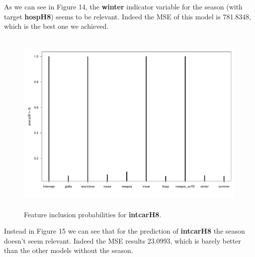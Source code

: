 \documentclass[12pt,a4paper]{article}
\theoremstyle{definition}
\theoremstyle{remark}
\begin{document}
\begin{appendices}
As we can see in Figure 14, the \textbf{winter} indicator variable for the season (with target \textbf{hospH8}) seems to be relevant. Indeed the MSE of this model is 781.8348, which is the best one we achieved.

\begin{figure}[htb!]
	\centering
	\includegraphics[width=140mm, height=90mm,scale=0.5]{szn2.pdf}
	\caption{Feature inclusion probabilities for \textbf{intcarH8}.}
\end{figure}

Instead in Figure 15 we can see that for the prediction of \textbf{intcarH8} the season doesn't seem relevant. Indeed the MSE results 23.0993, which is barely better than the other models without the season.
    
\end{appendices}
\end{document}
